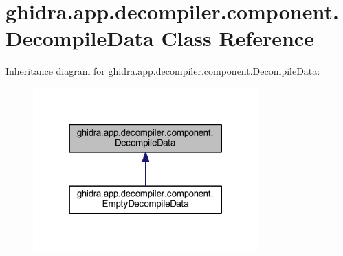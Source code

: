 \hypertarget{classghidra_1_1app_1_1decompiler_1_1component_1_1_decompile_data}{}\section{ghidra.\+app.\+decompiler.\+component.\+Decompile\+Data Class Reference}
\label{classghidra_1_1app_1_1decompiler_1_1component_1_1_decompile_data}


Inheritance diagram for ghidra.\+app.\+decompiler.\+component.\+Decompile\+Data\+:
\nopagebreak
\begin{figure}[H]
\begin{center}
\leavevmode
\includegraphics[width=246pt]{classghidra_1_1app_1_1decompiler_1_1component_1_1_decompile_data__inherit__graph}
\end{center}
\end{figure}
